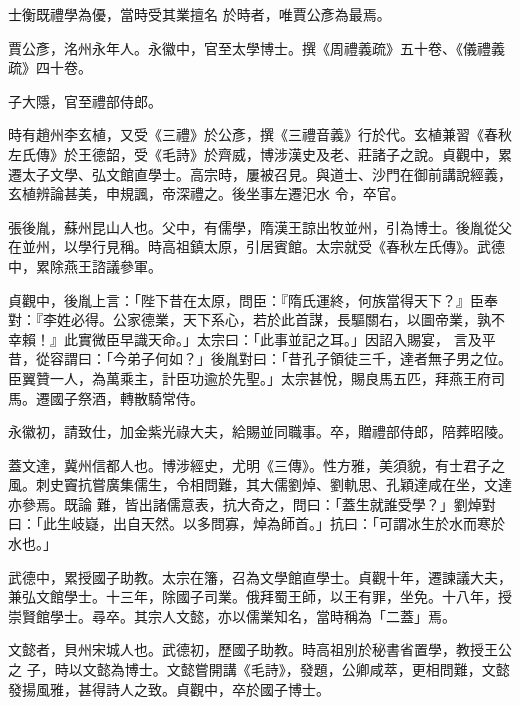 \begin{pinyinscope}
 士衡既禮學為優，當時受其業擅名
 於時者，唯賈公彥為最焉。



 賈公彥，洺州永年人。永徽中，官至太學博士。撰《周禮義疏》五十卷、《儀禮義疏》四十卷。



 子大隱，官至禮部侍郎。



 時有趙州李玄植，又受《三禮》於公彥，撰《三禮音義》行於代。玄植兼習《春秋左氏傳》於王德韶，受《毛詩》於齊威，博涉漢史及老、莊諸子之說。貞觀中，累遷太子文學、弘文館直學士。高宗時，屢被召見。與道士、沙門在御前講說經義，玄植辨論甚美，申規諷，帝深禮之。後坐事左遷汜水
 令，卒官。



 張後胤，蘇州昆山人也。父中，有儒學，隋漢王諒出牧並州，引為博士。後胤從父在並州，以學行見稱。時高祖鎮太原，引居賓館。太宗就受《春秋左氏傳》。武德中，累除燕王諮議參軍。



 貞觀中，後胤上言：「陛下昔在太原，問臣：『隋氏運終，何族當得天下？』臣奉對：『李姓必得。公家德業，天下系心，若於此首謀，長驅關右，以圖帝業，孰不幸賴！』此實微臣早識天命。」太宗曰：「此事並記之耳。」因詔入賜宴，
 言及平昔，從容謂曰：「今弟子何如？」後胤對曰：「昔孔子領徒三千，達者無子男之位。臣翼贊一人，為萬乘主，計臣功逾於先聖。」太宗甚悅，賜良馬五匹，拜燕王府司馬。遷國子祭酒，轉散騎常侍。



 永徽初，請致仕，加金紫光祿大夫，給賜並同職事。卒，贈禮部侍郎，陪葬昭陵。



 蓋文達，冀州信都人也。博涉經史，尤明《三傳》。性方雅，美須貌，有士君子之風。刺史竇抗嘗廣集儒生，令相問難，其大儒劉焯、劉軌思、孔穎達咸在坐，文達亦參焉。既論
 難，皆出諸儒意表，抗大奇之，問曰：「蓋生就誰受學？」劉焯對曰：「此生岐嶷，出自天然。以多問寡，焯為師首。」抗曰：「可謂冰生於水而寒於水也。」



 武德中，累授國子助教。太宗在籓，召為文學館直學士。貞觀十年，遷諫議大夫，兼弘文館學士。十三年，除國子司業。俄拜蜀王師，以王有罪，坐免。十八年，授崇賢館學士。尋卒。其宗人文懿，亦以儒業知名，當時稱為「二蓋」焉。



 文懿者，貝州宋城人也。武德初，歷國子助教。時高祖別於秘書省置學，教授王公之
 子，時以文懿為博士。文懿嘗開講《毛詩》，發題，公卿咸萃，更相問難，文懿發揚風雅，甚得詩人之致。貞觀中，卒於國子博士。




\end{pinyinscope}
